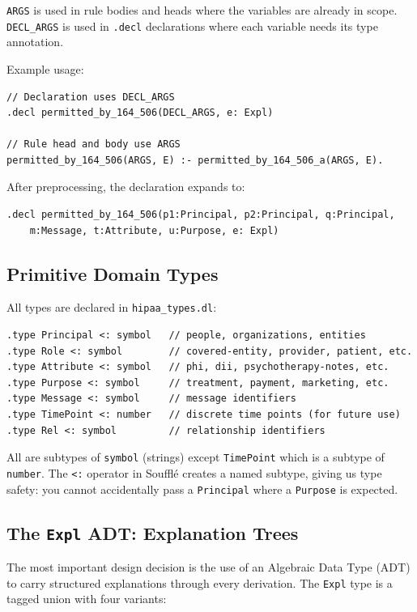 \documentclass[11pt,letterpaper]{article}
\begin{document}
\texttt{ARGS} is used in rule bodies and heads where the variables are already in scope. \texttt{DECL\_ARGS} is used in \texttt{.decl} declarations where each variable needs its type annotation.

Example usage:
\begin{lstlisting}[style=soufflestyle]
// Declaration uses DECL_ARGS
.decl permitted_by_164_506(DECL_ARGS, e: Expl)

// Rule head and body use ARGS
permitted_by_164_506(ARGS, E) :- permitted_by_164_506_a(ARGS, E).
\end{lstlisting}

After preprocessing, the declaration expands to:
\begin{lstlisting}[style=soufflestyle]
.decl permitted_by_164_506(p1:Principal, p2:Principal, q:Principal,
    m:Message, t:Attribute, u:Purpose, e: Expl)
\end{lstlisting}

\subsection{Primitive Domain Types}

All types are declared in \texttt{hipaa\_types.dl}:

\begin{lstlisting}[style=soufflestyle,caption={Type declarations from hipaa\_types.dl}]
.type Principal <: symbol   // people, organizations, entities
.type Role <: symbol        // covered-entity, provider, patient, etc.
.type Attribute <: symbol   // phi, dii, psychotherapy-notes, etc.
.type Purpose <: symbol     // treatment, payment, marketing, etc.
.type Message <: symbol     // message identifiers
.type TimePoint <: number   // discrete time points (for future use)
.type Rel <: symbol         // relationship identifiers
\end{lstlisting}

All are subtypes of \texttt{symbol} (strings) except \texttt{TimePoint} which is a subtype of \texttt{number}. The \texttt{<:} operator in Souffl\'{e} creates a named subtype, giving us type safety: you cannot accidentally pass a \texttt{Principal} where a \texttt{Purpose} is expected.

\subsection{The \texttt{Expl} ADT: Explanation Trees}
\label{sec:expl-adt}

The most important design decision is the use of an Algebraic Data Type (ADT) to carry structured explanations through every derivation. The \texttt{Expl} type is a tagged union with four variants:
\end{document}
